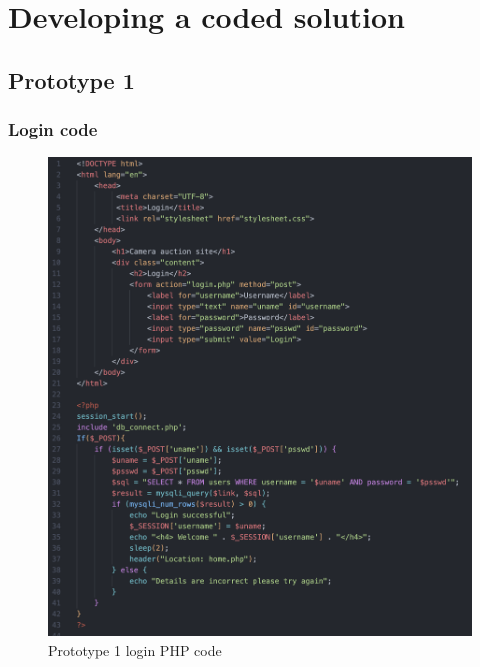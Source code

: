 \chapter{Developing a coded solution}
\section{Prototype 1 \parencite{visualstudio}}
\subsection{Login code} 
\begin{figure}[H]
    \centering
    \includegraphics[scale=0.5]{ch3_developing/proto1/pro1_login.png}
    \caption{Prototype 1 login PHP code}
    \label{fig:pro1_login}
\end{figure}
